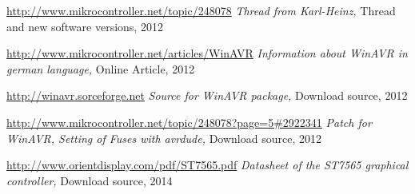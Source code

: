 \documentclass[12pt,a4paper,oneside,english]{report}
\begin{document}
\begin{thebibliography}{99}
\url{http://www.mikrocontroller.net/topic/248078}
\emph{Thread from Karl-Heinz,}
Thread and new software versions,
2012

\url{http://www.mikrocontroller.net/articles/WinAVR}
\emph{Information about WinAVR in german language,}
Online Article,
2012

\url{http://winavr.sorceforge.net}
\emph{Source for WinAVR package,}
Download source,
2012

\url{http://www.mikrocontroller.net/topic/248078?page=5#2922341}
\emph{Patch for WinAVR, Setting of Fuses with avrdude,}
Download source,
2012

\url{http://www.orientdisplay.com/pdf/ST7565.pdf}
\emph{Datasheet of the ST7565 graphical controller,}
Download source,
2014



\end{thebibliography}
\end{document}
